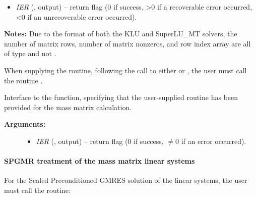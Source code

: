 \documentclass[letterpaper,10pt,english]{sphinxmanual}
\begin{document}
\begin{fulllineitems}
\begin{description}
\begin{itemize}
\item {} 
\emph{IER} (, output) -- return flag (0 if success, \textgreater{}0 if a recoverable error
occurred, \textless{}0 if an unrecoverable error occurred).

\end{itemize}

\end{description}

\textbf{Notes:} Due to the format of both the KLU and SuperLU\_MT
solvers, the number of matrix rows, number of matrix nonzeros, and
row index array are all of type  and not .

\end{fulllineitems}


When supplying the {\hyperref[f_interface/Usage:f/_/FARKSPMASS]{\emph{}}} routine, following the call
to either {\hyperref[f_interface/Usage:f/_/FARKMASSKLU]{\emph{}}} or {\hyperref[f_interface/Usage:f/_/FARKMASSSUPERLUMT]{\emph{}}},
the user must call the routine {\hyperref[f_interface/Usage:f/_/FARKSPARSESETMASS]{\emph{}}}.

\begin{fulllineitems}
\label{f_interface/Usage:f/_/FARKSPARSESETMASS}
Interface to the {\hyperref[c_interface/User_callable:c.ARKSlsSetSparseMassFn]{\emph{}}} function,
specifying that the user-supplied routine {\hyperref[f_interface/Usage:f/_/FARKSPMASS]{\emph{}}} has
been provided for the mass matrix calculation.
\begin{description}
\item[{\textbf{Arguments:}}] \leavevmode\begin{itemize}
\item {} 
\emph{IER} (, output) -- return flag (0 if success,
\(\ne 0\) if an error occurred).

\end{itemize}

\end{description}

\end{fulllineitems}



\paragraph{SPGMR treatment of the mass matrix linear systems}
\label{f_interface/Usage:spgmr-treatment-of-the-mass-matrix-linear-systems}
For the Scaled Preconditioned GMRES solution of the linear systems,
the user must call the {\hyperref[f_interface/Usage:f/_/FARKMASSSPGMR]{\emph{}}} routine:
\end{document}
